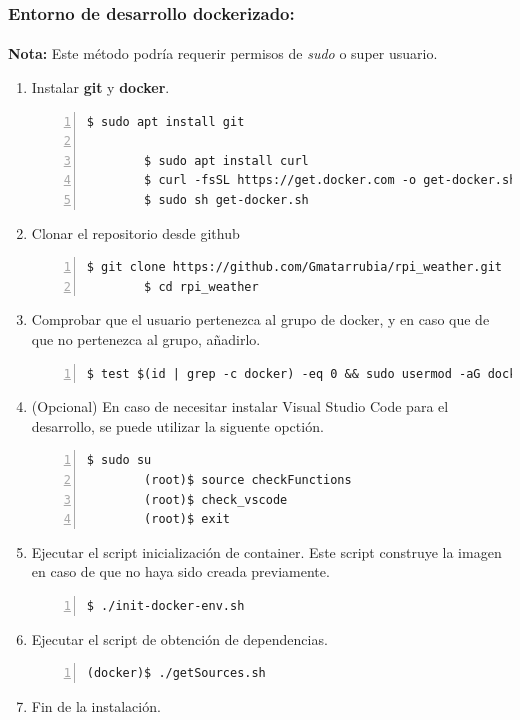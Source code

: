 \subsubsection{Entorno de desarrollo dockerizado:}

\paragraph{}\textbf{Nota:} Este método podría requerir permisos de \emph{sudo} o super
usuario.

\begin{enumerate}
    \item Instalar \textbf{\gls{git}} y \textbf{docker}.
    \begin{lstlisting}[style=consola, numbers=left]
        $ sudo apt install git

        $ sudo apt install curl
        $ curl -fsSL https://get.docker.com -o get-docker.sh
        $ sudo sh get-docker.sh
    \end{lstlisting}

    \item Clonar el repositorio desde github
    \begin{lstlisting}[style=consola, numbers=left]
        $ git clone https://github.com/Gmatarrubia/rpi_weather.git
        $ cd rpi_weather
    \end{lstlisting}

    \item Comprobar que el usuario pertenezca al grupo de docker, y en caso que de
    que no pertenezca al grupo, añadirlo.
    \begin{lstlisting}[style=consola, numbers=left]
        $ test $(id | grep -c docker) -eq 0 && sudo usermod -aG docker $(whoami)
    \end{lstlisting}

    \item (Opcional) En caso de necesitar instalar Visual Studio Code para el desarrollo,
    se puede utilizar la siguente opctión.
    \begin{lstlisting}[style=consola, numbers=left]
        $ sudo su
        (root)$ source checkFunctions
        (root)$ check_vscode
        (root)$ exit
    \end{lstlisting}

    \item Ejecutar el script inicialización de container. Este script construye la
    imagen en caso de que no haya sido creada previamente.
    \begin{lstlisting}[style=consola, numbers=left]
        $ ./init-docker-env.sh
    \end{lstlisting}

    \item Ejecutar el script de obtención de dependencias.
    \begin{lstlisting}[style=consola, numbers=left]
        (docker)$ ./getSources.sh
    \end{lstlisting}

    \item Fin de la instalación.
\end{enumerate}

